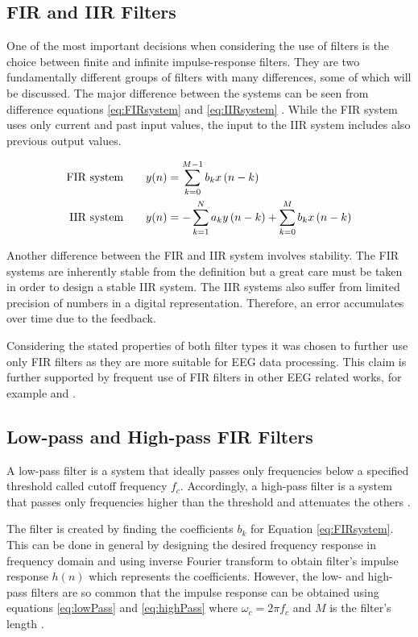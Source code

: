 \subsection{FIR and IIR Filters}
\label{ssec:FIRandIIR}
One of the most important decisions when considering the use of filters is the choice between finite and infinite impulse-response filters. They are two fundamentally different groups of filters with many differences, some of which will be discussed. The major difference between the systems can be seen from difference equations \ref{eq:FIRsystem} and \ref{eq:IIRsystem} \cite[p. 500]{DSP3}. While the FIR system uses only current and past input values, the input to the IIR system includes also previous output values.

\begin{align}
	\text{FIR system\qquad} &y(n)= \sum\limits_{k=0}^{M-1}b_kx\,(n-k) \label{eq:FIRsystem}\\
	\text{IIR system\qquad} &y(n)= -\sum\limits_{k=1}^{N}a_ky\,(n-k) + \sum\limits_{k=0}^{M}b_kx\,(n-k) \label{eq:IIRsystem}
\end{align}

Another difference between the FIR and IIR system involves stability. The FIR systems are inherently stable from the definition but a great care must be taken in order to design a stable IIR system. The IIR systems also suffer from limited precision of numbers in a digital representation. Therefore, an error accumulates over time due to the feedback. 

Considering the stated properties of both filter types it was chosen to further use only FIR filters as they are more suitable for EEG data processing. This claim is further supported by frequent use of FIR filters in other EEG related works, for example \cite{deltaCompNREM} and \cite{eegClass}.

\subsection{Low-pass and High-pass FIR Filters}
A low-pass filter is a system that ideally passes only frequencies below a specified threshold called cutoff frequency $f_c$. Accordingly, a high-pass filter is a system that passes only frequencies higher than the threshold and attenuates the others \cite[p. 331]{DSP3}. 

The filter is created by finding the coefficients $b_k$ for Equation \ref{eq:FIRsystem}. This can be done in general by designing the desired frequency response in frequency domain and using inverse Fourier transform to obtain filter's impulse response $h(n)$ which represents the coefficients. However, the low- and high-pass filters are so common that the impulse response can be obtained using equations \ref{eq:lowPass} and \ref{eq:highPass} where $\omega_c = 2 \pi f_c$ and $M$ is the filter's length \cite[p. 472]{DSP}.

